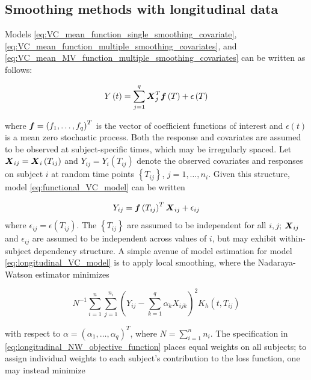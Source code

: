 \documentclass[12pt]{article}
\newcommand{\bff}{\mbox{\boldmath $f$}}
\newcommand{\bfX}{\mbox{\boldmath $X$}}
\begin{document}
\subsection{Smoothing methods with longitudinal data}

Models \ref{eq:VC_mean_function_single_smoothing_covariate}, \ref{eq:VC_mean_function_multiple_smoothing_covariates}, and \ref{eq:VC_mean_MV_function_multiple_smoothing_covariates} can be written as follows:

\begin{equation} \label{eq:functional_VC_model}
Y\left(t\right) = \sum_{j=1}^q \bfX_j^T \bff \left(T\right) + \epsilon\left(T\right)
\end{equation}

where $\bff = \left(f_1,\dots, f_q \right)^T$ is the vector of coefficient functions of interest and $\epsilon\left(t\right)$ is a mean zero stochastic process. Both the response and covariates are assumed to be observed at subject-specific times, which may be irregularly spaced. Let $\bfX_{ij} = \bfX_i\left(T_{ij}\right)$ and $Y_{ij} = Y_i\left(T_{ij}\right)$ denote the observed covariates and responses on subject $i$ at random time points $\left\{ T_{ij} \right\}$, $j=1,\dots,n_i$. Given this structure, model  \ref{eq:functional_VC_model} can be written 
   
\begin{equation} \label{longitudinal_VC_model}
Y_{ij} = \bff\left(T_{ij}\right)^T\bfX_{ij} + \epsilon_{ij}
\end{equation}
\noindent
where $\epsilon_{ij} = \epsilon\left(T_{ij}\right)$. The $\left\{ T_{ij} \right\}$ are assumed to be independent for all $i,j$; $\bfX_{ij}$ and $\epsilon_{ij}$ are assumed to be independent across values of $i$, but may exhibit within-subject dependency structure.  A simple avenue of model estimation for model \ref{eq:longitudinal_VC_model} is to apply local smoothing, where the Nadaraya-Watson estimator minimizes 

\begin{equation} \label{eq:longitudinal_NW_objective_function}
N^{-1} \sum_{i=1}^{n} \sum_{j=1}^{n_i} \left(Y_{ij} - \sum_{k=1}^q \alpha_k X_{ijk} \right)^2 K_h\left(t,T_{ij}\right)
\end{equation}
\noindent

with respect to $\alpha = \left(\alpha_1,\dots, \alpha_q \right)^T$, where $N = \sum_{i=1}^n n_i$. The specification in \ref{eq:longitudinal_NW_objective_function} places equal weights on all subjects; to assign individual weights to each subject's contribution to the loss function, one may instead minimize
\end{document}
